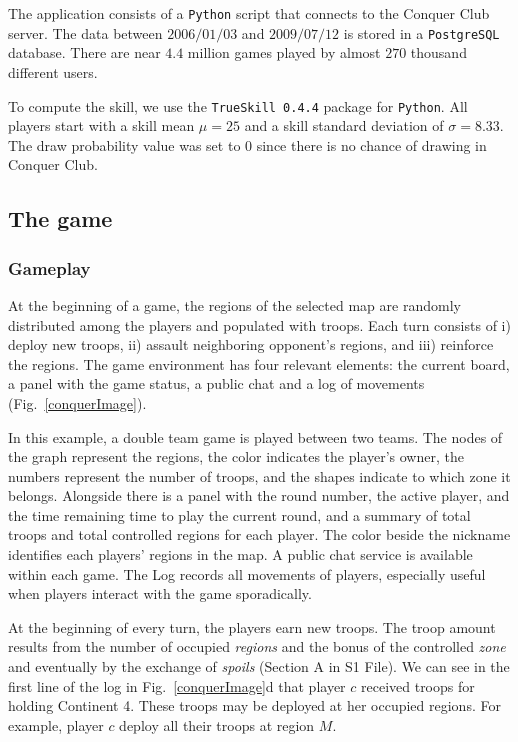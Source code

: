 \documentclass[a4paper,10pt]{book}
\theoremstyle{definition}
\begin{document}
The application consists of a \texttt{Python} script that connects to the Conquer Club server.
The data between $2006/01/03$ and $2009/07/12$ is stored in a \texttt{PostgreSQL} database.
There are near $4.4$ million games played by almost $270$ thousand different users.

To compute the skill, we use the \texttt{TrueSkill 0.4.4} package for \texttt{Python}.
All players start with a skill mean $\mu = 25$ and a skill standard deviation of $\sigma = 8.33$.
The draw probability value was set to 0 since there is no chance of drawing in Conquer Club. 

\subsection{The game}

\subsubsection*{Gameplay}\label{sub:gameplay}

At the beginning of a game, the regions of the selected map are randomly distributed among the players and populated with troops.
Each turn consists of i) deploy new troops, ii) assault neighboring opponent's regions, and iii) reinforce the regions.
The game environment has four relevant elements: the current board, a panel with the game status, a public chat and a log of movements (Fig.~\ref{conquerImage}).

In this example, a double team game is played between two teams.
The nodes of the graph represent the regions, the color indicates the player's owner, the numbers represent the number of troops, and the shapes indicate to which zone it belongs.
Alongside there is a panel with the round number, the active player, and the time remaining time to play the current round, and a summary of total troops and total controlled regions for each player.
The color beside the nickname identifies each players' regions in the map.
A public chat service is available within each game.
The Log records all movements of players, especially useful when players interact with the game sporadically.

At the beginning of every turn, the players earn new troops. 
The troop amount results from the number of occupied \emph{regions} and the bonus of the controlled \emph{zone} and eventually by the exchange of \emph{spoils} (Section A in S1 File).
We can see in the first line of the log in Fig.~\ref{conquerImage}d that player $c$ received troops for holding Continent 4.
These troops may be deployed at her occupied regions.
For example, player $c$ deploy all their troops at region $M$.
\end{document}
